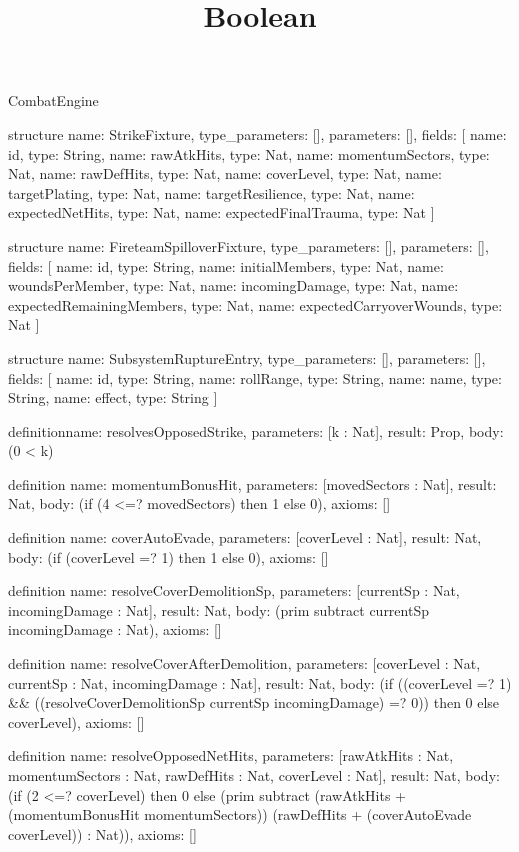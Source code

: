 \begin{lexlean}{CombatEngine}
\title{Boolean}
\begin{semanticmodule}
structure{
  name: StrikeFixture,
  type_parameters: [],
  parameters: [],
  fields: [
    {name: id, type: String},
    {name: rawAtkHits, type: Nat},
    {name: momentumSectors, type: Nat},
    {name: rawDefHits, type: Nat},
    {name: coverLevel, type: Nat},
    {name: targetPlating, type: Nat},
    {name: targetResilience, type: Nat},
    {name: expectedNetHits, type: Nat},
    {name: expectedFinalTrauma, type: Nat}
  ]
}

structure{
  name: FireteamSpilloverFixture,
  type_parameters: [],
  parameters: [],
  fields: [
    {name: id, type: String},
    {name: initialMembers, type: Nat},
    {name: woundsPerMember, type: Nat},
    {name: incomingDamage, type: Nat},
    {name: expectedRemainingMembers, type: Nat},
    {name: expectedCarryoverWounds, type: Nat}
  ]
}

structure{
  name: SubsystemRuptureEntry,
  type_parameters: [],
  parameters: [],
  fields: [
    {name: id, type: String},
    {name: rollRange, type: String},
    {name: name, type: String},
    {name: effect, type: String}
  ]
}

definition{name: resolvesOpposedStrike, parameters: [k : Nat], result: Prop, body: (0 < k)}

definition{
  name: momentumBonusHit,
  parameters: [movedSectors : Nat],
  result: Nat,
  body: (if (4 <=? movedSectors) then 1 else 0),
  axioms: []
}

definition{
  name: coverAutoEvade,
  parameters: [coverLevel : Nat],
  result: Nat,
  body: (if (coverLevel =? 1) then 1 else 0),
  axioms: []
}

definition{
  name: resolveCoverDemolitionSp,
  parameters: [currentSp : Nat, incomingDamage : Nat],
  result: Nat,
  body: (prim subtract currentSp incomingDamage : Nat),
  axioms: []
}

definition{
  name: resolveCoverAfterDemolition,
  parameters: [coverLevel : Nat, currentSp : Nat, incomingDamage : Nat],
  result: Nat,
  body: (if ((coverLevel =? 1) && ((resolveCoverDemolitionSp currentSp incomingDamage) =? 0)) then 0 else coverLevel),
  axioms: []
}

definition{
  name: resolveOpposedNetHits,
  parameters: [rawAtkHits : Nat, momentumSectors : Nat, rawDefHits : Nat, coverLevel : Nat],
  result: Nat,
  body: (if (2 <=? coverLevel) then 0 else (prim subtract (rawAtkHits + (momentumBonusHit momentumSectors)) (rawDefHits + (coverAutoEvade coverLevel)) : Nat)),
  axioms: []
}


\end{semanticmodule}
\end{lexlean}

